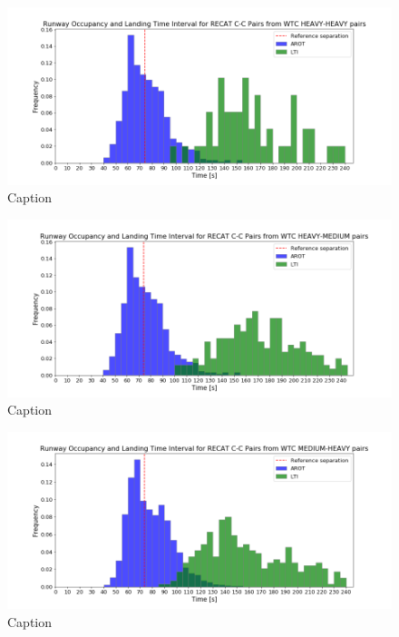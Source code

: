 \begin{figure}
    \centering
    \includegraphics[width=1\textwidth]{graphics/fig_CC_from_HH_pairs_time_sep.png}
    \caption[list of figures caption]{Caption}
    \label{fig:CC_from_HH_pairs_time_sep}
\end{figure}

\begin{figure}
    \centering
    \includegraphics[width=1\textwidth]{graphics/fig_CC_from_HM_pairs_time_sep.png}
    \caption[list of figures caption]{Caption}
    \label{fig:CC_from_HM_pairs_time_sep}
\end{figure}

\begin{figure}
    \centering
    \includegraphics[width=1\textwidth]{graphics/fig_CC_from_MH_pairs_time_sep.png}
    \caption[list of figures caption]{Caption}
    \label{fig:CC_from_MH_pairs_time_sep}
\end{figure}

